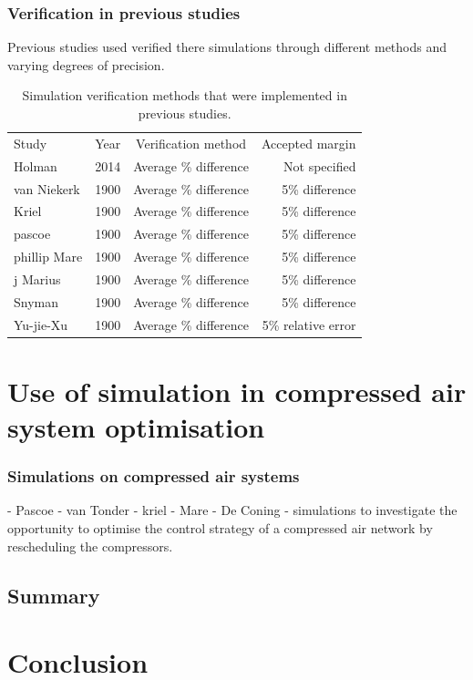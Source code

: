  	\subsubsection{Verification in previous studies}
 	Previous studies used verified there simulations through different methods and varying degrees of precision. \\
 	\begin{table}[h]
 		\centering
 		\begin{tabular}{p{5cm}ccr}
 			\hline
 			Study & Year & Verification method & Accepted margin\\
 			\hhline{====}
 			Holman \cite{Holman2014Masters} & 2014 & Average \% difference & Not specified  \\
 			van Niekerk \cite{vanNiekerk2012Value} & 1900 & Average \% difference & 5\% difference \\
 			Kriel \cite{Marais2012PhD} &  1900 & Average \% difference & 5\% difference \\
 			pascoe \cite{Pascoe2016Masters} & 1900 & Average \% difference & 5\% difference \\	
 			phillip Mare \cite{Mare2016PhD} & 1900 & Average \% difference & 5\% difference  \\
 			j Marius \cite{Marais2012PhD} & 1900 & Average \% difference & 5\% difference\\	
 			Snyman	\cite{Snyman2011Masters} & 1900 & Average \% difference & 5\% difference\\	
 			Yu-jie-Xu \cite{xu2016modeling}& 1900 & Average \% difference & 5\% relative error\\	
 			\hline
 		\end{tabular} 
 		\caption{Simulation verification methods that were implemented in previous studies.}
 		\label{table: Verification studies}
 	\end{table}
\clearpage	
\section{Use of simulation in compressed air system optimisation}
	

	\subsubsection{Simulations on compressed air systems}
		- Pascoe 
		- van Tonder
		- kriel
		- Mare
		- De Coning -  simulations to investigate the opportunity to optimise the control strategy of a compressed air network by rescheduling the compressors.
	\subsection{Summary}
	\label{Shortcomings of previous work}
		\clearpage	
\section{Conclusion}